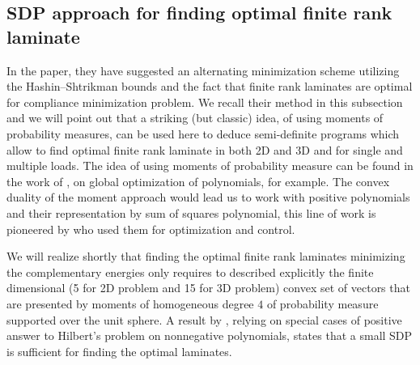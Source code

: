 \documentclass[preprint,3p]{elsarticle}
\begin{document}
\iffalse
\subsection{SDP approach for finding optimal finite rank laminate}
In the \citet{allaire1997shape} paper, they have suggested an alternating minimization scheme utilizing the Hashin--Shtrikman bounds and the fact that finite rank laminates are optimal for compliance minimization problem. We recall their method in this subsection and we will point out that a striking (but classic) idea, of using moments of probability measures, can be used here to deduce semi-definite programs which allow to find optimal finite rank laminate in both 2D and 3D and for single and multiple loads. The idea of using moments of probability measure can be found in the work of \citet{lasserre2001global}, on global optimization of polynomials, for example. The convex duality of the moment approach would lead us to work with positive polynomials and their representation by sum of squares polynomial, this line of work is pioneered by \citet{parrilo2000structured} who used them for optimization and control. 

We will realize shortly that finding the optimal finite rank laminates minimizing the complementary energies only requires to described explicitly the finite dimensional (5 for 2D problem and 15 for 3D problem) convex set of vectors that are presented by moments of homogeneous degree $4$ of probability measure supported over the unit sphere. A result by \citet{francfort1995fourth}, relying on special cases of positive answer to Hilbert's problem on nonnegative polynomials, states that a small SDP is sufficient for finding the optimal laminates. 
\end{document}
